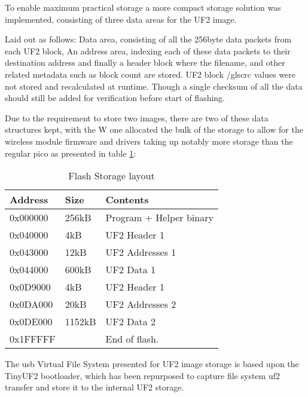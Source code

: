 To enable maximum practical storage a more compact storage solution was implemented, consisting of three data areas for the UF2 image.

Laid out as follows: Data area, consisting of all the 256byte data packets from each UF2 block, An address area, indexing each of these data packets to their destination address and finally a header block where the filename, and other related metadata such as block count are stored. UF2 block /gls{crc} values were not stored and recalculated at runtime. Though a single checksum of all the data should still be added for verification before start of flashing.

Due to the requirement to store two images, there are two of these data structures kept, with the W one allocated the bulk of the storage to allow for the wireless module firmware and drivers taking up notably more storage than the regular pico as presented in table \ref{table:file_storage}:

\begin{table}[h]
	\centering
	\caption{Flash Storage layout}%
	\vspace{-16.5pt}%

		\begin{tabular}{|l|l|l|}
			\hline
			Address & Size  & Contents        \\ \hline
			0x000000 & 256kB & Program + Helper binary \\ \hline
			0x040000 & 4kB & UF2 Header 1      \\ \hline
			0x043000 & 12kB & UF2 Addresses 1 \\ \hline
			0x044000 & 600kB & UF2 Data 1 \\ \hline
			0x0D9000 & 4kB & UF2 Header 1 \\ \hline
			0x0DA000 & 20kB & UF2 Addresses 2      \\ \hline
			0x0DE000 & 1152kB & UF2 Data 2 \\ \hline
			0x1FFFFF & & End of flash. \\ \hline
		\end{tabular}
		\label{table:file_storage}
\end{table}

The \gls{usb} Virtual File System presented for UF2 image storage is based upon the TinyUF2 bootloader\cite{TinyUF2Bootloader2023}, which has been repurposed to capture file system uf2 transfer and store it to the internal UF2 storage.

